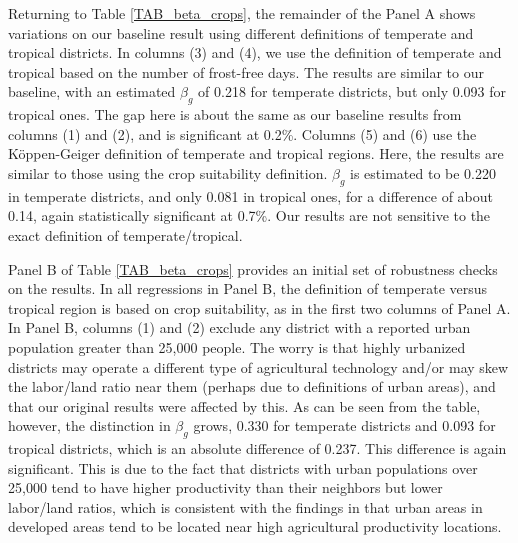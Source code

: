 \documentclass[11pt]{article}
\begin{document}
Returning to Table \ref{TAB_beta_crops}, the remainder of the Panel A shows variations on our baseline result using different definitions of temperate and tropical districts. In columns (3) and (4), we use the definition of temperate and tropical based on the number of frost-free days. The results are similar to our baseline, with an estimated $\beta_g$ of 0.218 for temperate districts, but only 0.093 for tropical ones. The gap here is about the same as our baseline results from columns (1) and (2), and is significant at 0.2\%. Columns (5) and (6) use the K{\"o}ppen-Geiger definition of temperate and tropical regions. Here, the results are similar to those using the crop suitability definition. $\beta_g$ is estimated to be 0.220 in temperate districts, and only 0.081 in tropical ones, for a difference of about 0.14, again statistically significant at 0.7\%. Our results are not sensitive to the exact definition of temperate/tropical.

Panel B of Table \ref{TAB_beta_crops} provides an initial set of robustness checks on the results. In all regressions in Panel B, the definition of temperate versus tropical region is based on crop suitability, as in the first two columns of Panel A. In Panel B, columns (1) and (2) exclude any district with a reported urban population greater than 25,000 people. The worry is that highly urbanized districts may operate a different type of agricultural technology and/or may skew the labor/land ratio near them (perhaps due to definitions of urban areas), and that our original results were affected by this. As can be seen from the table, however, the distinction in $\beta_g$ grows, 0.330 for temperate districts and 0.093 for tropical districts, which is an absolute difference of 0.237. This difference is again significant. This is due to the fact that districts with urban populations over 25,000 tend to have higher productivity than their neighbors but lower labor/land ratios, which is consistent with the findings in \cite{hssw2016} that urban areas in developed areas tend to be located near high agricultural productivity locations. 
\end{document}
